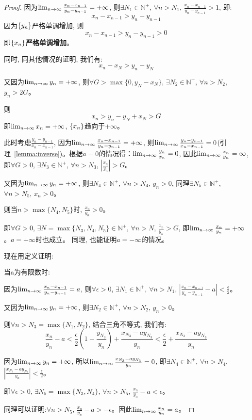 \begin{proof}
因为$\lim_{n \to \infty } \frac{x_n-x_{n-1}}{y_n-y_{n-1}} = +\infty$, 则$\exists N_1 \in \mathbb{N}^+$, $\forall n > N_1$, $\frac{x_n-x_{n-1}}{y_n-y_{n-1}} > 1$, 即:
\[ x_n - x_{n-1} > y_n - y_{n-1} \]
因为$\left\{ y_n\right\}$严格单调增加, 则
\[ x_n - x_{n-1} > y_n - y_{n-1}> 0 \]
即$\left\{ x_n\right\}${\bf 严格单调增加}。

同时, 同其他情况的证明, 我们有:
\[ x_n - x_N > y_n - y_N\]

又因为$\lim_{n \to \infty } y_n = +\infty$, 则$\forall G > \max\{0, y_N - x_N\}$, $\exists N_2 \in \mathbb{N}^+$, $\forall n > N_2$, $y_n > 2G$。

则
\[ x_n > y_n - y_N + x_N > G \]
即$\lim_{n \to \infty } x_n = +\infty$, $\left\{ x_n\right\}$趋向于$+\infty$。

此时考虑$\frac{y_n - y_{n-1}}{x_n - x_{n-1}}$, 因为$\lim_{n \to \infty } \frac{x_n-x_{n-1}}{y_n - y_{n-1}} = +\infty$, 则$\lim_{n \to \infty } \frac{y_n - y_{n-1}}{x_n-x_{n-1}} = 0$(引理~\ref{lemma:inverse})。根据$a = 0$的情况得：$\lim_{n \to \infty } \frac{y_n}{x_n} = 0$, 因此$\lim_{n \to \infty } \frac{x_n}{y_n} = \infty$, 即$\forall G > 0$, $\exists N_3 \in \mathbb{N}^+$, $\forall n > N_3$, $\left| \frac{x_n}{y_n} \right| > G$。

又因为$\lim_{n \to \infty } y_n = +\infty$, 则$\exists N_4 \in \mathbb{N}^+$, $\forall n > N_4$, $y_n > 0$, 同理$\exists N_5 \in \mathbb{N}^+$, $\forall n > N_5$, $x_n > 0$。

则当$n > \max\{ N_4, N_5 \}$时, $\frac{x_n}{y_n} > 0$。

即$\forall G > 0$, $\exists N = \max\{ N_3, N_4, N_5 \} \in \mathbb{N}^+$, $\forall n > N$, $\frac{x_n}{y_n} > G$, 即$\lim_{n \to \infty } \frac{x_n}{y_n} = +\infty$。$a = +\infty$时也成立。
同理, 也能证明$a = -\infty$的情况。


现在用定义证明:

当a为有限数时:

因为$\lim_{n \to \infty } \frac{x_n-x_{n-1}}{y_n-y_{n-1}} = a$, 则$\forall \epsilon > 0$, $\exists N_1 \in \mathbb{N}^+$, $\forall n > N_1$, $\left| \frac{x_n - x_{n-1}}{y_n - y_{n-1}} - a\right| < \frac{\epsilon}{2}$。

又因为$\lim_{n \to \infty } y_n = +\infty$, 则$\exists N_2 \in \mathbb{N}^+$, $\forall n > N_2$, $y_n > 0$。

则$\forall n > N_3 = \max\{N_1, N_2\}$, 结合三角不等式, 我们有:
\[ \frac{x_n}{y_n}-a < \frac{\epsilon}{2}\left(1 - \frac{y_{N_3}}{y_n}\right) + \frac{x_{N_3}-ay_{N_3}}{y_n} < \frac{\epsilon}{2} + \frac{x_{N_3}-ay_{N_3}}{y_n}\]

因为$\lim_{n \to \infty } y_n = +\infty$, 所以$\lim_{n \to \infty } \frac{x_{N_3}-ay_{N_3}}{y_n} = 0$, 即$\exists N_4 \in \mathbb{N}^+$, $\forall n > N_4$, $\left| \frac{x_{N_3}-ay_{N_3}}{y_n} \right| < \frac{\epsilon}{2}$。

即$\forall \epsilon > 0$, $\exists N_5 = \max\{N_3, N_4\}$, $\forall n > N_5$, $\frac{x_n}{y_n} - a < \epsilon$。

同理可以证明:$\forall n > N_5$, $\frac{x_n}{y_n} - a > -\epsilon$。因此$\lim_{n \to \infty } \frac{x_n}{y_n} = a$。
\end{proof}
